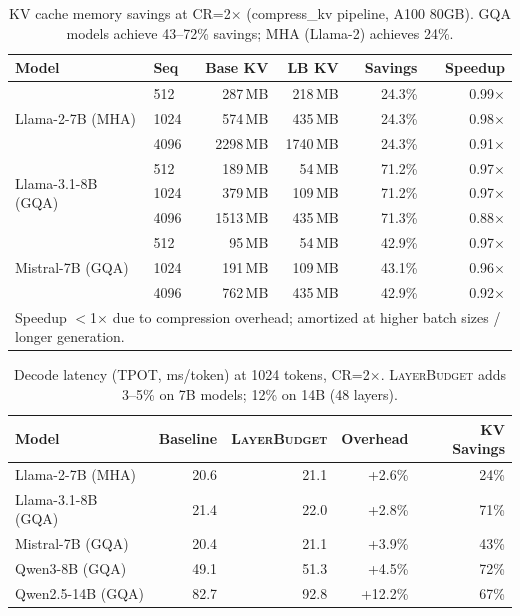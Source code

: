 \documentclass{article}
\newcommand{\layerbudget}{\textsc{LayerBudget}\xspace}
\begin{document}
\begin{table}[h]
\centering
\caption{KV cache memory savings at CR=2$\times$ (compress\_kv pipeline, A100 80GB).  GQA models achieve 43--72\% savings; MHA (Llama-2) achieves 24\%.}
\label{tab:e2e_scaling}
\small
\begin{tabular}{@{}llrrrr@{}}
\toprule
Model & Seq & Base KV & LB KV & Savings & Speedup \\
\midrule
\multirow{3}{*}{Llama-2-7B (MHA)}
& 512  & 287\,MB & 218\,MB & 24.3\% & 0.99$\times$ \\
& 1024 & 574\,MB & 435\,MB & 24.3\% & 0.98$\times$ \\
& 4096 & 2298\,MB & 1740\,MB & 24.3\% & 0.91$\times$ \\
\midrule
\multirow{3}{*}{Llama-3.1-8B (GQA)}
& 512  & 189\,MB & 54\,MB & 71.2\% & 0.97$\times$ \\
& 1024 & 379\,MB & 109\,MB & 71.2\% & 0.97$\times$ \\
& 4096 & 1513\,MB & 435\,MB & 71.3\% & 0.88$\times$ \\
\midrule
\multirow{3}{*}{Mistral-7B (GQA)}
& 512  & 95\,MB & 54\,MB & 42.9\% & 0.97$\times$ \\
& 1024 & 191\,MB & 109\,MB & 43.1\% & 0.96$\times$ \\
& 4096 & 762\,MB & 435\,MB & 42.9\% & 0.92$\times$ \\
\bottomrule
\multicolumn{6}{l}{\scriptsize Speedup $<$1$\times$ due to compression overhead; amortized at higher batch sizes / longer generation.}
\end{tabular}
\end{table}

\begin{table}[h]
\centering
\caption{Decode latency (TPOT, ms/token) at 1024 tokens, CR=2$\times$.
\layerbudget adds 3--5\% on 7B models; 12\% on 14B (48 layers).}
\label{tab:latency}
\small
\begin{tabular}{@{}lrrrr@{}}
\toprule
Model & Baseline & \layerbudget & Overhead & KV Savings \\
\midrule
Llama-2-7B (MHA)    & 20.6 & 21.1 & +2.6\% & 24\% \\
Llama-3.1-8B (GQA)  & 21.4 & 22.0 & +2.8\% & 71\% \\
Mistral-7B (GQA)    & 20.4 & 21.1 & +3.9\% & 43\% \\
Qwen3-8B (GQA)      & 49.1 & 51.3 & +4.5\% & 72\% \\
Qwen2.5-14B (GQA)   & 82.7 & 92.8 & +12.2\% & 67\% \\
\bottomrule
\end{tabular}
\end{table}
\end{document}
